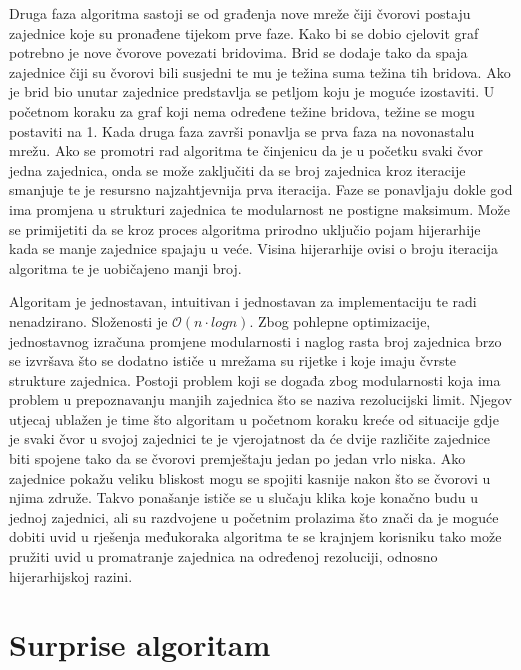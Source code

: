 Druga faza algoritma sastoji se od građenja nove mreže čiji čvorovi postaju zajednice koje su pronađene tijekom prve faze. Kako bi se dobio cjelovit graf potrebno je nove čvorove povezati bridovima. Brid se dodaje tako da spaja zajednice čiji su čvorovi bili susjedni te mu je težina suma težina tih bridova. Ako je brid bio unutar zajednice predstavlja se petljom koju je moguće izostaviti. U početnom koraku za graf koji nema određene težine bridova, težine se mogu postaviti na 1. Kada druga faza završi ponavlja se prva faza na novonastalu mrežu. Ako se promotri rad algoritma te činjenicu da je u početku svaki čvor jedna zajednica, onda se može zaključiti da se broj zajednica kroz iteracije smanjuje te je resursno najzahtjevnija prva iteracija. Faze se ponavljaju dokle god ima promjena u strukturi zajednica te modularnost ne postigne maksimum. Može se primijetiti da se kroz proces algoritma prirodno uključio pojam hijerarhije kada se manje zajednice spajaju u veće. Visina hijerarhije ovisi o broju iteracija algoritma te je uobičajeno manji broj.

Algoritam je jednostavan, intuitivan i jednostavan za implementaciju te radi nenadzirano. Složenosti je $\mathcal{O}(n \cdot log{}n)$. Zbog pohlepne optimizacije, jednostavnog izračuna promjene modularnosti i naglog rasta broj zajednica brzo se izvršava što se dodatno ističe u mrežama su rijetke i koje imaju čvrste strukture zajednica. Postoji problem koji se događa zbog modularnosti koja ima problem u prepoznavanju manjih zajednica što se naziva rezolucijski limit. Njegov utjecaj ublažen je time što algoritam u početnom koraku kreće od situacije gdje je svaki čvor u svojoj zajednici te je vjerojatnost da će dvije različite zajednice biti spojene tako da se čvorovi premještaju jedan po jedan vrlo niska. Ako zajednice pokažu veliku bliskost mogu se spojiti kasnije nakon što se čvorovi u njima združe. Takvo ponašanje ističe se u slučaju klika koje konačno budu u jednoj zajednici, ali su razdvojene u početnim prolazima što znači da je moguće dobiti uvid u rješenja međukoraka algoritma te se krajnjem korisniku tako može pružiti uvid u promatranje zajednica na određenoj rezoluciji, odnosno hijerarhijskoj razini.


\section{Surprise algoritam}


